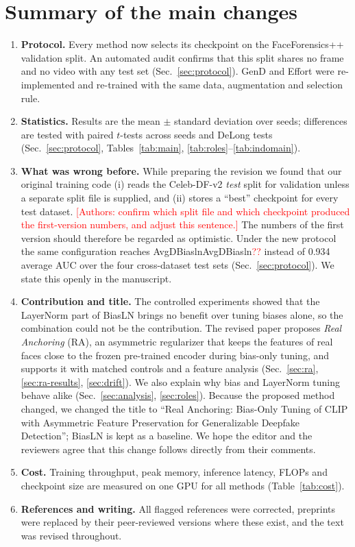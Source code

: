 \documentclass[11pt]{article}
\newif\ifpending\pendingtrue
\newcommand{\pending}[1]{\ifpending\textcolor{red}{[#1]}\else\errmessage{pending: #1}\fi}
\newcommand{\num}[1]{\ifcsname #1\endcsname\csname #1\endcsname\else\textcolor{red}{??}\fi}
\begin{document}
\section*{Summary of the main changes}
\begin{enumerate}
\item \textbf{Protocol.} Every method now selects its checkpoint on the FaceForensics++ validation split. An automated audit confirms that this split shares no frame and no video with any test set (Sec.~\ref{sec:protocol}). GenD and Effort were re-implemented and re-trained with the same data, augmentation and selection rule.
\item \textbf{Statistics.} Results are the mean $\pm$ standard deviation over seeds; differences are tested with paired $t$-tests across seeds and DeLong tests (Sec.~\ref{sec:protocol}, Tables~\ref{tab:main}, \ref{tab:roles}--\ref{tab:indomain}).
\item \textbf{What was wrong before.} While preparing the revision we found that our original training code (i) reads the Celeb-DF-v2 \emph{test} split for validation unless a separate split file is supplied, and (ii) stores a ``best'' checkpoint for every test dataset. \pending{Authors: confirm which split file and which checkpoint produced the first-version numbers, and adjust this sentence.} The numbers of the first version should therefore be regarded as optimistic. Under the new protocol the same configuration reaches \num{AvgDBiasln} instead of 0.934 average AUC over the four cross-dataset test sets (Sec.~\ref{sec:protocol}). We state this openly in the manuscript.
\item \textbf{Contribution and title.} The controlled experiments showed that the LayerNorm part of BiasLN brings no benefit over tuning biases alone, so the combination could not be the contribution. The revised paper proposes \emph{Real Anchoring} (RA), an asymmetric regularizer that keeps the features of real faces close to the frozen pre-trained encoder during bias-only tuning, and supports it with matched controls and a feature analysis (Sec.~\ref{sec:ra}, \ref{sec:ra-results}, \ref{sec:drift}). We also explain why bias and LayerNorm tuning behave alike (Sec.~\ref{sec:analysis}, \ref{sec:roles}). Because the proposed method changed, we changed the title to ``Real Anchoring: Bias-Only Tuning of CLIP with Asymmetric Feature Preservation for Generalizable Deepfake Detection''; BiasLN is kept as a baseline. We hope the editor and the reviewers agree that this change follows directly from their comments.
\item \textbf{Cost.} Training throughput, peak memory, inference latency, FLOPs and checkpoint size are measured on one GPU for all methods (Table~\ref{tab:cost}).
\item \textbf{References and writing.} All flagged references were corrected, preprints were replaced by their peer-reviewed versions where these exist, and the text was revised throughout.
\end{enumerate}
\end{document}
